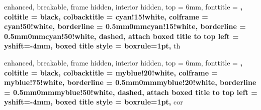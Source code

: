 \usepackage[american]{babel}
\usepackage[tt=false, type1=true]{libertine}
\usepackage{charter}
\usepackage{enumitem}
\usepackage{algorithm2e}
\usepackage{csquotes}
\usepackage[normalem]{ulem}
\usepackage{titlesec}
\usepackage{parskip}
\usepackage{microtype}

\usepackage{amsmath, amsfonts, amsthm, amssymb, mathtools}
\usepackage{siunitx}
\usepackage[makeroom]{cancel}
\usepackage{xfrac}
\usepackage[f]{esvect} %

\usepackage[dvipsnames]{xcolor}
\usepackage{fancyhdr}
\usepackage[margin=2cm]{geometry}
\usepackage{tikz}
\usepackage[most,many,breakable]{tcolorbox}
\usepackage{caption}
\usepackage{subcaption}
\usepackage{booktabs}
\usepackage{float}
\usepackage{ulem}
\usepackage{listings}
\usepackage[numbered]{matlab-prettifier}

\usepackage{varwidth}

\usepackage{hyperref,theoremref}



\setlength{\parindent}{0pt}



{%
	enhanced,
	breakable,
	frame hidden,
  interior hidden,
  top = 6mm,
  fonttitle = \bfseries,
	coltitle = black,
  colbacktitle = cyan!15!white,
  colframe = cyan!50!white,
  borderline = {0.5mm}{0mm}{cyan!15!white},
  borderline = {0.5mm}{0mm}{cyan!50!white, dashed},
  attach boxed title to top left = {yshift=-4mm},
  boxed title style = {boxrule=1pt}, 
}{th}

{%
	enhanced,
	breakable,
	frame hidden,
	interior hidden,
	top = 6mm,
	fonttitle = \bfseries,
	coltitle = black,
	colbacktitle = myblue!20!white,
	colframe = myblue!75!white,
	borderline = {0.5mm}{0mm}{myblue!20!white},
	borderline = {0.5mm}{0mm}{myblue!50!white, dashed},
	attach boxed title to top left = {yshift=-4mm},
	boxed title style = {boxrule=1pt},
}{cor}

